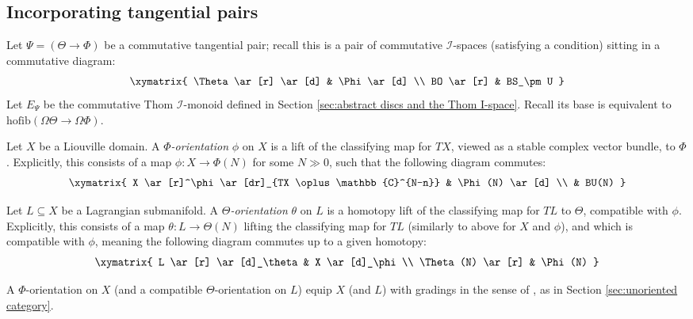 \documentclass{TPmod}
\newcommand{\hofib}{\mathrm{hofib}}
\def\bC{\mathbb{C}}
\newcommand{\cI}{\mathcal{I}}
\numberwithin{equation}{section}
\begin{document}
\subsection{Incorporating tangential pairs}\label{sec: tang fuk}
    Let $\Psi=(\Theta \to \Phi)$ be a commutative tangential pair; recall this is a pair of commutative $\cI$-spaces (satisfying a condition) sitting in a commutative diagram:
    \begin{equation}
        \xymatrix{
            \Theta 
            \ar[r]
            \ar[d]
            &
            \Phi 
            \ar[d]
            \\
            BO 
            \ar[r]
            &
            BS_\pm U
        }
    \end{equation}
    Let $E_\Psi$ be the commutative Thom $\cI$-monoid  defined in Section \ref{sec:abstract discs and the Thom I-space}. Recall its base is equivalent to $\hofib(\Omega \Theta \to \Omega \Phi)$.
    \begin{defn}\label{def: phi thet or}
        Let $X$ be a Liouville domain. A \emph{$\Phi$-orientation} $\phi$ on $X$ is a lift of the classifying map for $TX$, viewed as a stable complex vector bundle, to $\Phi$. Explicitly, this consists of a map $\phi: X \to \Phi(N)$ for some $N \gg 0$, such that the following diagram commutes:
        \begin{equation}
            \xymatrix{
                X
                \ar[r]^\phi 
                \ar[dr]_{TX \oplus \bC^{N-n}}
                &
                \Phi(N)
                \ar[d]
                \\
                &
                BU(N)
            }
        \end{equation}
    
        Let $L \subseteq X$ be a Lagrangian submanifold. A \emph{$\Theta$-orientation} $\theta$ on $L$ is a homotopy lift of the classifying map for $TL$ to $\Theta$, compatible with $\phi$. Explicitly, this consists of a map $\theta: L \to \Theta(N)$ lifting the classifying map for $TL$ (similarly to above for $X$ and $\phi$), and which is compatible with $\phi$, meaning the following diagram commutes up to a given homotopy: 
        \begin{equation}
            \xymatrix{
                L 
                \ar[r]
                \ar[d]_\theta
                &
                X
                \ar[d]_\phi
                \\
                \Theta(N)
                \ar[r]
                &
                \Phi(N)
            }
        \end{equation}  
    \end{defn}
    \begin{rmk}
        A $\Phi$-orientation on $X$ (and a compatible $\Theta$-orientation on $L$) equip $X$ (and $L$) with gradings in the sense of \cite{Seidel:graded}, as in Section \ref{sec:unoriented category}.
    \end{rmk}
  
\end{document}
